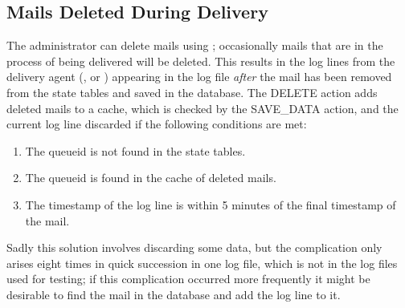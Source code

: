 \subsection{Mails Deleted During Delivery}

\label{Mails deleted during delivery}

The administrator can delete mails using ; occasionally
mails that are in the process of being delivered will be deleted.  This
results in the log lines from the delivery agent (,
 or ) appearing in the log file
\textit{after\/} the mail has been removed from the state tables and saved
in the database.  The DELETE action adds deleted mails to a cache, which is
checked by the SAVE\_DATA action, and the current log line discarded if the
following conditions are met:

\begin{enumerate}

    \item The queueid is not found in the state tables.

    \item The queueid is found in the cache of deleted mails.

    \item The timestamp of the log line is within 5 minutes of the final
        timestamp of the mail.

\end{enumerate}

Sadly this solution involves discarding some data, but the complication
only arises eight times in quick succession in one log file, which is not
in the \numberOFlogFILES{} log files used for testing; if this complication
occurred more frequently it might be desirable to find the mail in the
database and add the log line to it.

